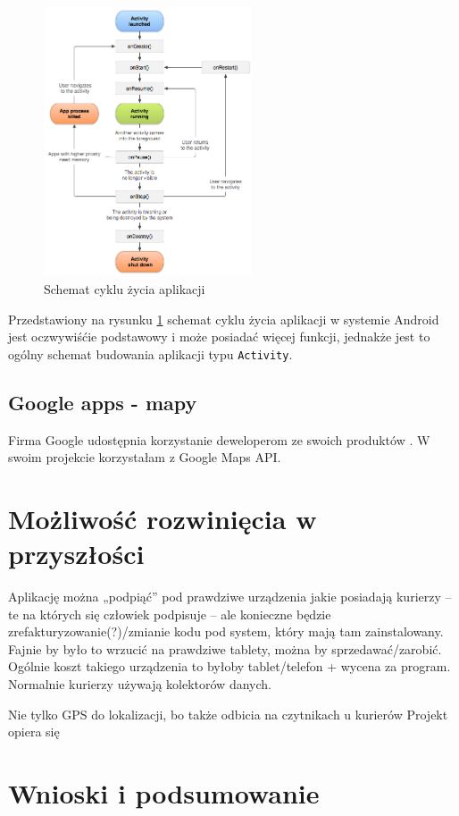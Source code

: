 \documentclass[eng,printmode,oneside]{mgr}
\begin{document}
\begin{figure}
\centering
\includegraphics[width=0.55\textwidth]{andActivityLifecycle.png}
\caption{Schemat cyklu życia aplikacji\cite{developer.android}}
\label{fig:andActivityLifecycle}
\end{figure}

Przedstawiony na rysunku \ref{fig:andActivityLifecycle} schemat cyklu życia aplikacji w systemie
Android jest oczwywiśćie podstawowy i może posiadać więcej funkcji, jednakże jest to ogólny
schemat budowania aplikacji typu \texttt{Activity}.

\section{Google apps - mapy}

Firma Google udostępnia korzystanie deweloperom ze swoich produktów
\cite{developer.google}. W swoim projekcie korzystałam z Google Maps API. 

\chapter{Możliwość rozwinięcia w przyszłości}
Aplikację można „podpiąć” pod prawdziwe urządzenia jakie posiadają kurierzy – te na których się człowiek podpisuje – ale konieczne będzie 
zrefakturyzowanie(?)/zmianie kodu pod system, który mają tam zainstalowany.
	Fajnie by było to wrzucić na prawdziwe tablety, można by sprzedawać/zarobić. Ogólnie koszt takiego urządzenia to byłoby tablet/telefon 
	+ wycena za program.
	Normalnie kurierzy używają kolektorów danych.
	
	
 Nie tylko GPS do lokalizacji, bo także odbicia
na czytnikach u kurierów Projekt opiera się 

\chapter{Wnioski i podsumowanie}

\listoffigures
\lstlistoflistings
\end{document}
